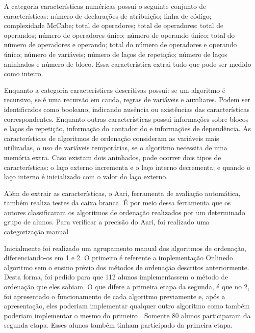 	    A categoria características numéricas possui o seguinte conjunto de características:
	    número de declarações de atribuição; linha de código; complexidade McCabe; total de
	    operadores; total de operadores; total de operandos; número de operadores único;
	    número de operando único; total do número de operadores e operando; total do
	    número de operadores e operando único; número de variáveis; número de laços de
	    repetição; número de laços aninhados e número de bloco. Essa característica
	    extrai tudo que pode ser medido como inteiro.
	    
	    Enquanto a categoria características descritivas possui: se um algoritmo é
	    recursivo, se é uma recursão em cauda, regras de variáveis e 
	    auxiliares. Podem ser identificados como booleano, indicando ausência ou
	    existências das características correspondentes. Enquanto outras características
	    possui informações sobre blocos e laços de repetição, informação do contador do
	     e informações de dependência. As características de algoritmos de
	    ordenação consideram as variáveis mais utilizadas, o uso de variáveis temporárias,
	    se o algoritmo necessita de uma memória extra. Caso existam dois  aninhados,
	    pode ocorrer dois tipos de características: o laço externo incrementa e o laço
	    interno decrementa; e quando o laço interno é inicializado com o valor do laço
	    externo. 
	    
	    Além de extrair as características, o Aari, ferramenta de avaliação automática,
	    também realiza testes da caixa branca. É por meio dessa ferramenta que os
	    autores classificaram os algoritmos de ordenação realizados por um determinado
	    grupo de alunos. Para verificar a precisão do Aari, foi realizado uma
	    categorização manual
	    
	    Inicialmente foi realizado um agrupamento manual dos algoritmos de ordenação,
	    diferenciando-os em  1 e  2. O primeiro
	     é referente a implementação  Onlinedo algoritmo sem o ensino
	    prévio dos métodos de ordenação descritos anteriormente. Desta forma,
	    foi pedido para que 112 alunos implementassem o método de ordenação que
	    eles sabiam. O que difere a primeira etapa da segunda, é que no 
	    2, foi apresentado o funcionamento de cada algoritmo previamente e, após a
	    apresentação, eles poderiam implementar qualquer outro algoritmo como também
	    poderiam implementar o mesmo do primeiro . Somente 80 alunos
	    participaram da segunda etapa. Esses alunos também tinham participado da
	    primeira etapa.
	    
